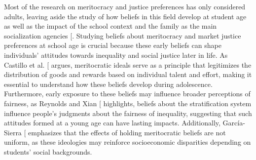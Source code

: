 \documentclass[
  12pt,
  letterpaper,
]{article}
\begin{document}
Most of the research on meritocracy and justice preferences has only
considered adults, leaving aside the study of how beliefs in this field
develop at student age as well as the impact of the school context and
the family as the main socialization agencies
{[}\citeproc{ref-batruch_belief_2022}{3}{]}. Studying beliefs about
meritocracy and market justice preferences at school age is crucial
because these early beliefs can shape individuals' attitudes towards
inequality and social justice later in life. As Castillo et al.
{[}\citeproc{ref-castillo_meritocracia_2019}{12}{]} argues, meritocratic
ideals serve as a principle that legitimizes the distribution of goods
and rewards based on individual talent and effort, making it essential
to understand how these beliefs develop during adolescence. Furthermore,
early exposure to these beliefs may influence broader perceptions of
fairness, as Reynolds and Xian
{[}\citeproc{ref-reynolds_perceptions_2014}{13}{]} highlights, beliefs
about the stratification system influence people's judgments about the
fairness of inequality, suggesting that such attitudes formed at a young
age can have lasting impacts. Additionally, García-Sierra
{[}\citeproc{ref-garcia-sierra_dark_2023}{14}{]} emphasizes that the
effects of holding meritocratic beliefs are not uniform, as these
ideologies may reinforce socioeconomic disparities depending on
students' social backgrounds.
\end{document}
